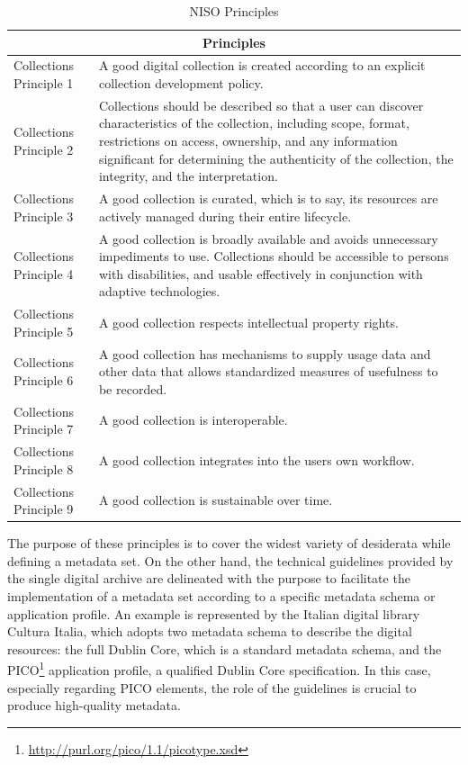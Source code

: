 \documentclass[epsfig,a4paper,12pt,titlepage]{book}
\begin{document}
\begin{table}[h]
    \centering
  \begin{tabular}{ |l|m{12cm}| }
  \hline
  \multicolumn{2}{|c|}{Principles} \\
  \hline
  Collections Principle 1 & A good digital collection is created according to an explicit collection development policy.  \\ \hline
  Collections Principle 2 & Collections should be described so that a user can discover characteristics of the collection, including scope, format, restrictions on access, ownership, and any information significant for determining the  authenticity of the collection, the integrity, and the interpretation.\\ \hline
  Collections Principle 3 & A good collection is curated, which is to say, its resources are actively managed during their entire lifecycle. \\ \hline
  Collections Principle 4 & A good collection is broadly available and avoids unnecessary impediments to use. Collections should be accessible to persons with disabilities, and usable effectively in conjunction with adaptive technologies.  \\ \hline
  Collections Principle 5 & A good collection respects intellectual property rights. \\ \hline
  Collections Principle 6 & A good collection has mechanisms to supply usage data and other data that allows standardized measures of usefulness to be recorded. \\ \hline
  Collections Principle 7 & A good collection is interoperable. \\ \hline
  Collections Principle 8 & A good collection integrates into the users own workflow. \\ \hline
  Collections Principle 9 & A good collection is sustainable over time. \\ 
  \hline
\end{tabular}

    \caption{NISO Principles}
		\label{tab:2}       %
\end{table}
\begin{center}
\end{center}

The purpose of these principles is to cover the widest variety of desiderata while defining a metadata set. On the other hand, the technical guidelines provided by the single digital archive are delineated with the purpose to facilitate the implementation of a metadata set according to a specific metadata schema or application profile. An example is represented  by the Italian digital library Cultura Italia, which adopts two metadata schema to describe the digital resources: the full Dublin Core, which is a standard metadata schema, and the PICO\footnote{\url{http://purl.org/pico/1.1/picotype.xsd}} application profile, a qualified Dublin Core specification. In this case, especially regarding PICO elements, the role of the guidelines is crucial to produce high-quality metadata.   
\end{document}
